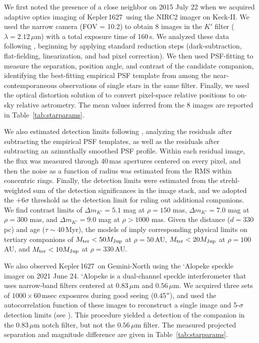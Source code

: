 \documentclass[12pt,modern,twocolumn,tighten]{aastex63}
\newcommand{\sn}{Kepler\,1627} %
\begin{document}
We first noted the presence of a close neighbor on 2015 July 22 when
we acquired adaptive optics imaging of \sn\ using the NIRC2 imager on
Keck-II. We used the narrow camera (FOV = 10.2\arcsec) to obtain 8
images in the $K'$ filter ($\lambda = 2.12\,\mu$m) with a total
exposure time of 160\,s. We analyzed these data following
\citet{kraus_impact_2016}, beginning by applying standard reduction
steps (dark-subtraction, flat-fielding, linearization, and bad pixel
correction). We then used PSF-fitting to measure the separation,
position angle, and contrast of the candidate companion, identifying
the best-fitting empirical PSF template from among the
near-contemporaneous observations of single stars in the same filter.
Finally, we used the optical distortion solution of \citet{yelda_2010}
to convert pixel-space relative positions to on-sky relative
astrometry. The mean values inferred from the 8 images are reported in
Table~\ref{tab:starparams}.

We also estimated detection limits following
\citet{kraus_impact_2016}, analyzing the residuals after subtracting
the empirical PSF templates, as well as the residuals after
subtracting an azimuthally smoothed PSF profile. Within each residual
image, the flux was measured through 40\,mas apertures centered on
every pixel, and then the noise as a function of radius was estimated
from the RMS within concentric rings. Finally, the detection limits
were estimated from the strehl-weighted sum of the detection
significances in the image stack, and we adopted the $+6\sigma$
threshold as the detection limit for ruling out additional companions.
We find contrast limits of $\Delta m_{K'} = 5.1$ mag at $\rho = 150$ mas,
$\Delta m_{K'} = 7.0$ mag at $\rho = 300$ mas, and $\Delta m_{K'} = 9.0$ mag
at $\rho > 1000$ mas.  Given the distance ($d = 330$\,pc) and age
($\tau \sim 40$\,Myr), the models of \citet{chabrier_2000} imply
corresponding physical limits on tertiary companions of $M_{\rm ter} < 50
M_{\rm Jup}$ at $\rho = 50$\,AU, $M_{\rm ter} < 20 M_{\rm Jup}$ at $\rho =
100$\,AU, and $M_{\rm ter} < 10 M_{\rm Jup}$ at $\rho = 330$\,AU.

We also observed \sn\ on Gemini-North using the `Alopeke speckle
imager on 2021 June 24.  `Alopeke is a dual-channel speckle
interferometer that uses narrow-band filters centered at 0.83\,$\mu$m
and $0.56\,\mu$m.  We acquired three sets of $1000\times 60$$\,$msec
exposures during good seeing (0.45$''$), and used the autocorrelation
function of these images to reconstruct a single image and 5-$\sigma$
detection limits (see \citealt{howell_speckle_2011}).  This procedure
yielded a detection of the companion in the 0.83\,$\mu$m notch filter,
but not the $0.56\,\mu$m filter.
The measured projected separation and magnitude difference
are given in Table~\ref{tab:starparams}.
\end{document}
